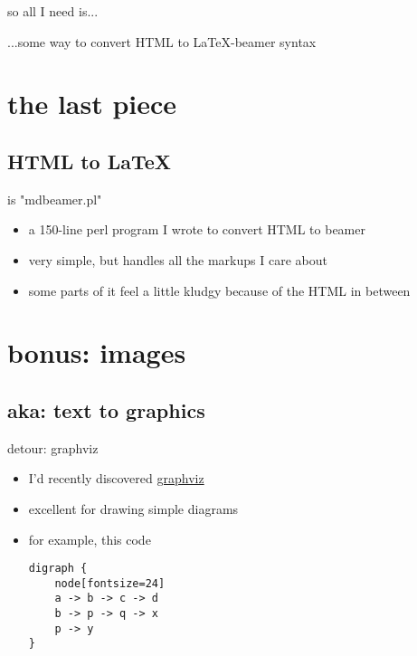 \documentclass{beamer}
\begin{document}
\begin{frame}{so all I need is...}

...some way to convert HTML to LaTeX-beamer syntax



\end{frame}


\section{the last piece}

\subsection{HTML to LaTeX}

\begin{frame}{is "mdbeamer.pl"}

\begin{itemize}
\item
a 150-line perl program I wrote to convert HTML to beamer
\item
very simple, but handles all the markups I care about
\item
some parts of it feel a little kludgy because of the HTML in between
\end{itemize}



\end{frame}


\section{bonus: images}

\subsection{aka: text to graphics}

\begin{frame}[fragile]{detour: graphviz}

\begin{itemize}
\item
I'd recently discovered \href{http://www.graphviz.org/}{graphviz}
\item
excellent for drawing simple diagrams
\item
for example, this code

\begin{verbatim}
digraph {
    node[fontsize=24]
    a -> b -> c -> d
    b -> p -> q -> x
    p -> y
}

\end{verbatim}

\end{itemize}



\end{frame}
\end{document}
